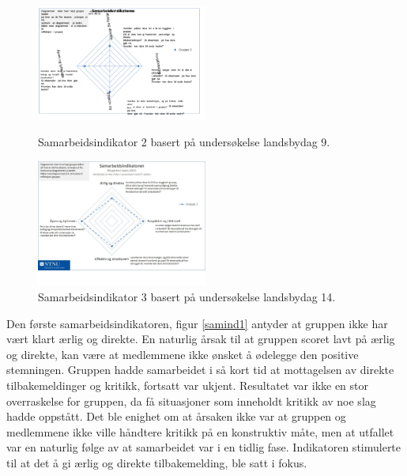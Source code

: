 \begin{figure}[h!]
  \caption{Samarbeidsindikator 2 basert på undersøkelse landsbydag 9.}
  \centering
    \includegraphics[width=0.5\textwidth]{Bilder/samarbeidsindikator_2.png}
    \label{samind2}
\end{figure}

\begin{figure}[h!]
  \centering
    \includegraphics[width=0.5\textwidth]{Bilder/samarbeidsindikator_3.jpg}
    \caption{Samarbeidsindikator 3 basert på undersøkelse landsbydag 14.}
    \label{samind3}
\end{figure}

Den første samarbeidsindikatoren, figur \ref{samind1} antyder at gruppen ikke har vært klart ærlig og direkte.
En naturlig årsak til at gruppen scoret lavt på ærlig og direkte, kan være at medlemmene ikke ønsket å ødelegge den positive stemningen. Gruppen hadde samarbeidet i så kort tid at mottagelsen av direkte tilbakemeldinger og kritikk, fortsatt var ukjent. Resultatet var ikke en stor overraskelse for gruppen, da få situasjoner som inneholdt kritikk av noe slag hadde oppstått. Det ble enighet om at årsaken ikke var at gruppen og medlemmene ikke ville håndtere kritikk på en konstruktiv måte, men at utfallet var en naturlig følge av at samarbeidet var i en tidlig fase. Indikatoren stimulerte til at det å gi ærlig og direkte tilbakemelding, ble satt i fokus. \\

